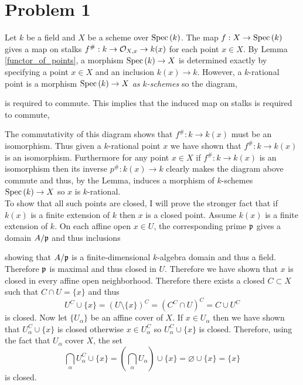 \documentclass[12pt]{article}
\begin{document}


\section{Problem 1}

Let $k$ be a field and $X$ be a scheme over $\mathrm{Spec}\left( k \right)$. The map $f : X \to \mathrm{Spec}\left( k \right)$ gives a map on stalks $f^\# : k \to \mathcal{O}_{X, x} \to k(x)$ for each point $x \in X$. By Lemma \ref{functor_of_points}, a morphism $\mathrm{Spec}\left( k \right) \to X$ is determined exactly by specifying a point $x \in X$ and an inclusion $k(x) \to k$. However, a $k$-rational point is a morphism $\mathrm{Spec}\left( k \right) \to X$ \textit{as $k$-schemes} so the diagram,
\begin{center}
\end{center} 
is required to commute. This implies that the induced map on stalks is required to commute,
\begin{center}
\end{center} 
The commutativity of this diagram shows that $f^\# : k \to k(x)$ must be an isomorphism. Thus given a $k$-rational point $x$ we have shown that $f^\# : k \to k(x)$ is an isomorphism. Furthermore for any point $x \in X$ if $f^\# : k \to k(x)$ is an isomorphism then its inverse $p^\# : k(x) \to k$ clearly makes the diagram above commute and thus, by the Lemma, induces a morphism of $k$-schemes $\mathrm{Spec}\left( k \right) \to X$ so $x$ is $k$-rational. 
\bigskip\\
To show that all such points are closed, I will prove the stronger fact that if $k(x)$ is a finite extension of $k$ then $x$ is a closed point. Assume $k(x)$ is a finite extension of $k$. On each affine open $x \in U$, the corresponding prime $\mathfrak{p}$ gives a domain $A / \mathfrak{p}$ and thus inclusions
\begin{center}
\end{center}
showing that $A / \mathfrak{p}$ is a finite-dimensional $k$-algebra domain and thus a field. Therefore $\mathfrak{p}$ is maximal and thus closed in $U$. Therefore we have shown that $x$ is closed in every affine open neighborhood. Therefore there exists a closed $C \subset X$ such that $C \cap U = \{ x \}$ and thus \[ U^C \cup \{ x \} = (U \setminus \{ x \})^C = (C^C \cap U)^C = C \cup U^C \]
is closed. Now let $\{ U_\alpha \}$ be an affine cover of $X$. If $x \in U_\alpha$ then we have shown that $U_\alpha^C \cup \{ x \}$ is closed otherwise $x \in U_\alpha^C$ so $U_\alpha^C \cup \{ x \}$ is closed. Therefore, using the fact that $U_\alpha$ cover $X$, the set
\[ \bigcap_{\alpha} U^C_\alpha \cup \{ x \} = \left( \bigcap_\alpha U_\alpha \right) \cup \{ x \} = \varnothing \cup \{ x \} = \{ x \} \]   
is closed. 
\end{document}
